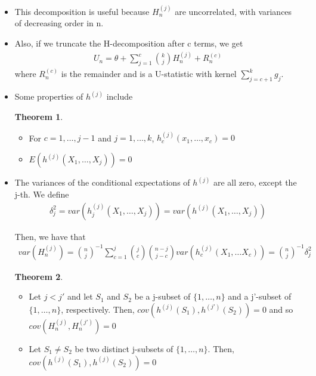 \documentclass{article}
\theoremstyle{definition}
\newtheorem{theorem}{Theorem}
\numberwithin{Def}{section}
\begin{document}
\begin{itemize}
    \item This decomposition is useful because $H_n^{(j)}$ are uncorrelated, with variances of decreasing order in n. 
    \item Also, if we truncate the H-decomposition after c terms, we get 
    \begin{align*}
        U_n = \theta + \sum_{j=1}^c {k \choose j}H_n^{(j)} + R_n^{(c)}
    \end{align*}
    where $R_n^{(c)}$ is the remainder and is a U-statistic with kernel $\sum_{j=c+1}^k g_j$.
    
    \item Some properties of $h^{(j)}$ include
    \begin{theorem}
    \begin{itemize}
        \item For $c = 1, \dotsc, j-1$ and $j = 1, \dotsc, k$, $h_c^{(j)}(x_1, \dotsc, x_c) = 0$
        \item $E(h^{(j)}(X_1, \dotsc, X_j)) = 0$
    \end{itemize}
    \end{theorem}
    
    \item The variances of the conditional expectations of $h^{(j)}$ are all zero, except the j-th. We define 
    \begin{align}
        \delta_j^2 = var(h_j^{(j)}(X_1, \dotsc, X_j)) = var(h^{(j)}(X_1, \dotsc, X_j))
    \end{align}
    
    Then, we have that 
    \begin{align}
        var(H_n^{(j)}) = {n \choose j}^{-1}\sum_{c=1}^j {j \choose c}{n-j \choose j-c}var(h_c^{(j)}(X_1, \dotsc X_c)) = {n \choose j}^{-1}\delta_j^2
    \end{align}
    
    \begin{theorem}
    \begin{itemize}
        \item Let $j <j'$ and let $S_1$ and $S_2$ be a j-subset of $\{1, \dotsc, n\}$ and a j'-subset of $\{1, \dotsc, n\}$, respectively. Then, $cov(h^{(j)}(S_1), h^{(j')}(S_2)) = 0$ and so $cov(H_n^{(j)}, H_n^{(j')}) = 0$
        \item Let $S_1 \neq S_2$ be two distinct j-subsets of $\{1, \dotsc, n\}$. Then, $cov(h^{(j)}(S_1), h^{(j)}(S_2)) = 0$
    \end{itemize}
    \end{theorem}
    



\end{itemize}
\end{document}
